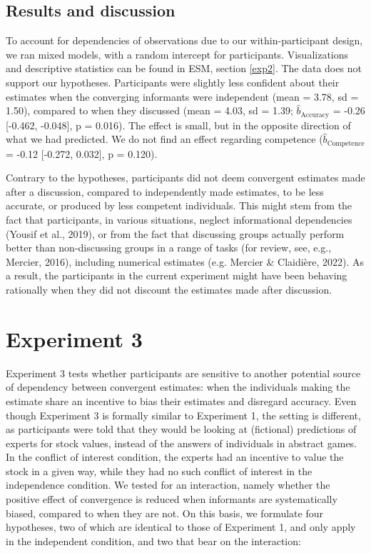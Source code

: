 \documentclass[
  doc,floatsintext]{apa6}
\begin{document}
\subsection{Results and discussion}\label{results-and-discussion-1}

To account for dependencies of observations due to our within-participant design, we ran mixed models, with a random intercept for participants. Visualizations and descriptive statistics can be found in ESM, section \ref{exp2}. The data does not support our hypotheses. Participants were slightly less confident about their estimates when the converging informants were independent (mean = 3.78, sd = 1.50), compared to when they discussed (mean = 4.03, sd = 1.39; \(\hat{b}_{\text{Accuracy}}\) = -0.26 {[}-0.462, -0.048{]}, p = 0.016). The effect is small, but in the opposite direction of what we had predicted. We do not find an effect regarding competence (\(\hat{b}_{\text{Competence}}\) = -0.12 {[}-0.272, 0.032{]}, p = 0.120).

Contrary to the hypotheses, participants did not deem convergent estimates made after a discussion, compared to independently made estimates, to be less accurate, or produced by less competent individuals. This might stem from the fact that participants, in various situations, neglect informational dependencies (Yousif et al., 2019), or from the fact that discussing groups actually perform better than non-discussing groups in a range of tasks (for review, see, e.g., Mercier, 2016), including numerical estimates (e.g. Mercier \& Claidière, 2022). As a result, the participants in the current experiment might have been behaving rationally when they did not discount the estimates made after discussion.

\section{Experiment 3}\label{experiment-3}

Experiment 3 tests whether participants are sensitive to another potential source of dependency between convergent estimates: when the individuals making the estimate share an incentive to bias their estimates and disregard accuracy. Even though Experiment 3 is formally similar to Experiment 1, the setting is different, as participants were told that they would be looking at (fictional) predictions of experts for stock values, instead of the answers of individuals in abstract games. In the conflict of interest condition, the experts had an incentive to value the stock in a given way, while they had no such conflict of interest in the independence condition. We tested for an interaction, namely whether the positive effect of convergence is reduced when informants are systematically biased, compared to when they are not. On this basis, we formulate four hypotheses, two of which are identical to those of Experiment 1, and only apply in the independent condition, and two that bear on the interaction:
\end{document}

